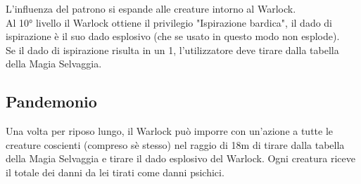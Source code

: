 L'influenza del patrono si espande alle creature intorno al Warlock. \\ Al 10° livello il Warlock ottiene il privilegio "Ispirazione bardica", il dado di ispirazione è il suo dado esplosivo (che se usato in questo modo non esplode). \\ Se il dado di ispirazione risulta in un 1, l'utilizzatore deve tirare dalla tabella della Magia Selvaggia.

\subsection{Pandemonio}

Una volta per riposo lungo, il Warlock può imporre con un'azione a tutte le creature coscienti (compreso sè stesso) nel raggio di 18m di tirare dalla tabella della Magia Selvaggia e tirare il dado esplosivo del Warlock. Ogni creatura riceve il totale dei danni da lei tirati come danni psichici.


